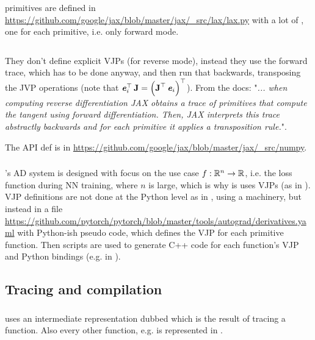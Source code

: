 \documentclass[11pt]{scrartcl}
\newcommand{\ipmpy}[1]{\inputminted[xleftmargin=0.9cm]{python}{#1}}
\begin{document}
\subsubsection{\jax}

\numpy primitives are defined in
\url{https://github.com/google/jax/blob/master/jax/_src/lax/lax.py} with a lot
of , one for each primitive, i.e. only forward mode.

\ipmpy{../talk/code/jax_lax_sin.py}

They don't define explicit VJPs (for reverse mode), instead they use the
forward trace, which has to be done anyway, and then run that backwards,
transposing the JVP operations (note that $\bm{\mathit{e}}_i^\top\,\bm{\mathbf{J}} =
\left(\bm{\mathbf{J}}^\top\,\bm{\mathit{e}}_i\right)^\top$). From the docs: "\emph{... when
computing reverse differentiation JAX obtains a trace of primitives that
compute the tangent using forward differentiation. Then, JAX interprets this
trace abstractly backwards and for each primitive it applies a transposition
rule.}".

The \numpy API def is in
\url{https://github.com/google/jax/blob/master/jax/_src/numpy}.

\subsubsection{\pytorch}

\pytorch's AD system is designed with focus on the use case $f: \mathbb
R^n\rightarrow\mathbb R$, i.e. the loss function during NN training, where $n$ is
large, which is why is uses VJPs (as in \autograd). VJP definitions are not
done at the Python level as in \jax, using a  machinery, but instead
in a  file
\url{https://github.com/pytorch/pytorch/blob/master/tools/autograd/derivatives.yaml}
with Python-ish pseudo code, which defines the VJP for each 
primitive function. Then scripts are used to generate C++ code for each
function's VJP and Python bindings (e.g. in ).

\subsection{Tracing and compilation}

\subsubsection{\jax}

\jax uses an intermediate representation dubbed  which is the result
of tracing a function. Also every other function, e.g.  is
represented in .
\end{document}
